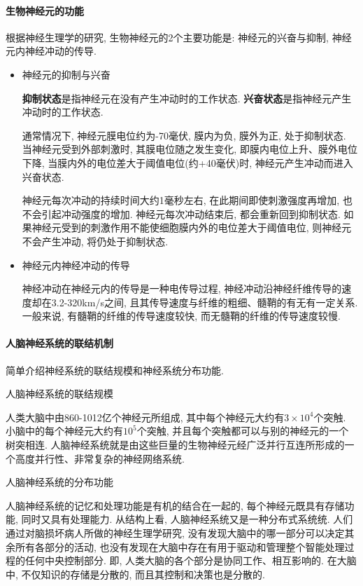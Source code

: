 \paragraph{生物神经元的功能}
根据神经生理学的研究, 生物神经元的2个主要功能是: 神经元的兴奋与抑制, 神经元内神经冲动的传导.
\begin{itemize}
\item {} 神经元的抑制与兴奋

\textbf{抑制状态}是指神经元在没有产生冲动时的工作状态. \textbf{兴奋状态}是指神经元产生冲动时的工作状态.

通常情况下, 神经元膜电位约为-70毫伏, 膜内为负, 膜外为正, 处于抑制状态. 当神经元受到外部刺激时, 其膜电位随之发生变化, 即膜内电位上升、膜外电位下降, 当膜内外的电位差大于阈值电位(约+40毫伏)时, 神经元产生冲动而进入兴奋状态.

\begin{remark}
    神经元每次冲动的持续时间大约1毫秒左右, 在此期间即使刺激强度再增加, 也不会引起冲动强度的增加. 神经元每次冲动结束后, 都会重新回到抑制状态. 如果神经元受到的刺激作用不能使细胞膜内外的电位差大于阈值电位, 则神经元不会产生冲动, 将仍处于抑制状态.
\end{remark}

\item {} 神经元内神经冲动的传导

神经冲动在神经元内的传导是一种电传导过程, 神经冲动沿神经纤维传导的速度却在3.2-320\si{km/s}之间, 且其传导速度与纤维的粗细、髓鞘的有无有一定关系. 一般来说, 有髓鞘的纤维的传导速度较快, 而无髓鞘的纤维的传导速度较慢.
\end{itemize}
\paragraph{人脑神经系统的联结机制} 简单介绍神经系统的联结规模和神经系统分布功能.

 人脑神经系统的联结规模

人类大脑中由860-1012亿个神经元所组成, 其中每个神经元大约有$3\times 10^4$个突触. 小脑中的每个神经元大约有$10^5$个突触, 并且每个突触都可以与别的神经元的一个树突相连. 人脑神经系统就是由这些巨量的生物神经元经广泛并行互连所形成的一个高度并行性、非常复杂的神经网络系统.

 人脑神经系统的分布功能

人脑神经系统的记忆和处理功能是有机的结合在一起的, 每个神经元既具有存储功能, 同时又具有处理能力. 从结构上看, 人脑神经系统又是一种分布式系统统.
人们通过对脑损坏病人所做的神经生理学研究, 没有发现大脑中的哪一部分可以决定其余所有各部分的活动, 也没有发现在大脑中存在有用于驱动和管理整个智能处理过程的任何中央控制部分.
即, 人类大脑的各个部分是协同工作、相互影响的. 在大脑中, 不仅知识的存储是分散的, 而且其控制和决策也是分散的.
